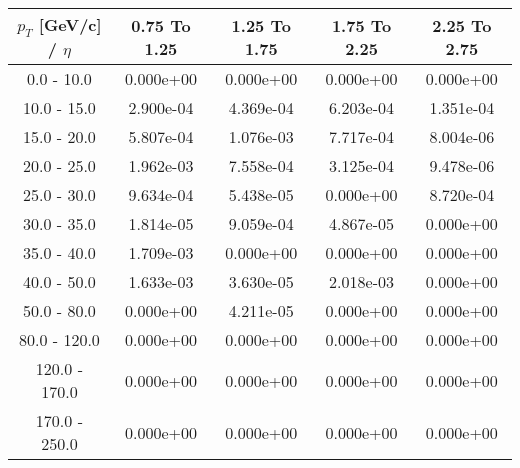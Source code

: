 \begin{tabular}{|c|c|c|c|c|}\hline 
$p_T$ [GeV/c] / $\eta$  & 0.75 To 1.25 & 1.25 To 1.75 & 1.75 To 2.25 & 2.25 To 2.75 \\ 
 \hline 
0.0 - 10.0 & 0.000e+00 & 0.000e+00 & 0.000e+00 & 0.000e+00 \\ 
10.0 - 15.0 & 2.900e-04 & 4.369e-04 & 6.203e-04 & 1.351e-04 \\ 
15.0 - 20.0 & 5.807e-04 & 1.076e-03 & 7.717e-04 & 8.004e-06 \\ 
20.0 - 25.0 & 1.962e-03 & 7.558e-04 & 3.125e-04 & 9.478e-06 \\ 
25.0 - 30.0 & 9.634e-04 & 5.438e-05 & 0.000e+00 & 8.720e-04 \\ 
30.0 - 35.0 & 1.814e-05 & 9.059e-04 & 4.867e-05 & 0.000e+00 \\ 
35.0 - 40.0 & 1.709e-03 & 0.000e+00 & 0.000e+00 & 0.000e+00 \\ 
40.0 - 50.0 & 1.633e-03 & 3.630e-05 & 2.018e-03 & 0.000e+00 \\ 
50.0 - 80.0 & 0.000e+00 & 4.211e-05 & 0.000e+00 & 0.000e+00 \\ 
80.0 - 120.0 & 0.000e+00 & 0.000e+00 & 0.000e+00 & 0.000e+00 \\ 
120.0 - 170.0 & 0.000e+00 & 0.000e+00 & 0.000e+00 & 0.000e+00 \\ 
170.0 - 250.0 & 0.000e+00 & 0.000e+00 & 0.000e+00 & 0.000e+00 \\ 
 \hline 
\end{tabular} 
